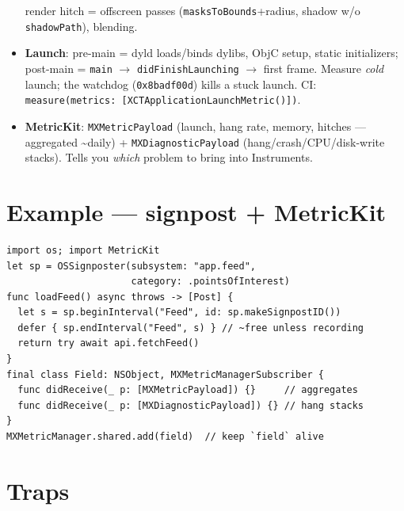 \documentclass[8pt]{extarticle}
\begin{document}
\begin{multicols}{2}
\begin{itemize}
        render hitch = offscreen passes (\texttt{masksToBounds}+radius, shadow w/o
        \texttt{shadowPath}), blending.
  \item \textbf{Launch}: pre-main = dyld loads/binds dylibs, ObjC setup,
        static initializers; post-main = \texttt{main} $\to$ \texttt{didFinishLaunching}
        $\to$ first frame. Measure \emph{cold} launch; the watchdog
        (\texttt{0x8badf00d}) kills a stuck launch. CI:
        \texttt{measure(metrics: [XCTApplicationLaunchMetric()])}.
  \item \textbf{MetricKit}: \texttt{MXMetricPayload} (launch, hang rate, memory,
        hitches — aggregated \textasciitilde daily) + \texttt{MXDiagnosticPayload}
        (hang/crash/CPU/disk-write stacks). Tells you \emph{which} problem to bring
        into Instruments.
\end{itemize}

\columnbreak

\section{Example — signpost + MetricKit}
\begin{lstlisting}[language=SwiftSheet]
import os; import MetricKit
let sp = OSSignposter(subsystem: "app.feed",
                      category: .pointsOfInterest)
func loadFeed() async throws -> [Post] {
  let s = sp.beginInterval("Feed", id: sp.makeSignpostID())
  defer { sp.endInterval("Feed", s) } // ~free unless recording
  return try await api.fetchFeed()
}
final class Field: NSObject, MXMetricManagerSubscriber {
  func didReceive(_ p: [MXMetricPayload]) {}     // aggregates
  func didReceive(_ p: [MXDiagnosticPayload]) {} // hang stacks
}
MXMetricManager.shared.add(field)  // keep `field` alive
\end{lstlisting}

\section{Traps}
\begin{itemize}
\end{itemize}


\end{multicols}
\end{document}
